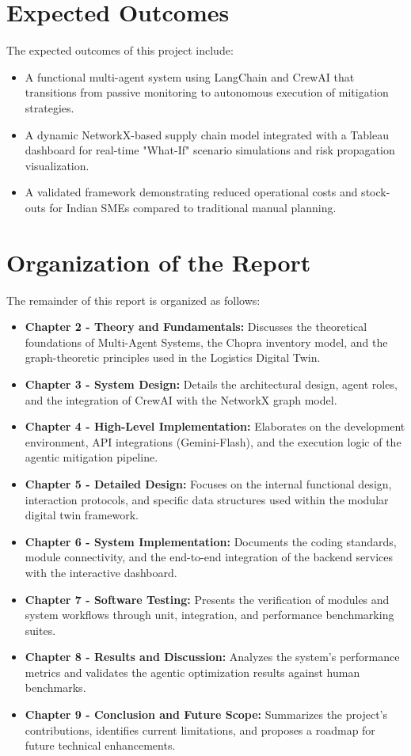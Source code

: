 \section[Expected Outcomes]{\textbf{Expected Outcomes}}
The expected outcomes of this project include:
\begin{itemize}
\item A functional multi-agent system using LangChain and CrewAI that transitions from passive monitoring to autonomous execution of mitigation strategies.
\item A dynamic NetworkX-based supply chain model integrated with a Tableau dashboard for real-time "What-If" scenario simulations and risk propagation visualization.
\item A validated framework demonstrating reduced operational costs and stock-outs for Indian SMEs compared to traditional manual planning.
\end{itemize}

\section[Organization of the Report]{\textbf{Organization of the Report}}
The remainder of this report is organized as follows:

\begin{itemize}
    \item \textbf{Chapter 2 - Theory and Fundamentals:} Discusses the theoretical foundations of Multi-Agent Systems, the Chopra inventory model, and the graph-theoretic principles used in the Logistics Digital Twin.
    \item \textbf{Chapter 3 - System Design:} Details the architectural design, agent roles, and the integration of CrewAI with the NetworkX graph model.
    \item \textbf{Chapter 4 - High-Level Implementation:} Elaborates on the development environment, API integrations (Gemini-Flash), and the execution logic of the agentic mitigation pipeline.
    \item \textbf{Chapter 5 - Detailed Design:} Focuses on the internal functional design, interaction protocols, and specific data structures used within the modular digital twin framework.
    \item \textbf{Chapter 6 - System Implementation:} Documents the coding standards, module connectivity, and the end-to-end integration of the backend services with the interactive dashboard.
    \item \textbf{Chapter 7 - Software Testing:} Presents the verification of modules and system workflows through unit, integration, and performance benchmarking suites.
    \item \textbf{Chapter 8 - Results and Discussion:} Analyzes the system's performance metrics and validates the agentic optimization results against human benchmarks.
    \item \textbf{Chapter 9 - Conclusion and Future Scope:} Summarizes the project's contributions, identifies current limitations, and proposes a roadmap for future technical enhancements.
\end{itemize}

